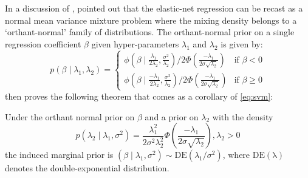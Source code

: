 \documentclass[lineno]{biometrika}
\begin{document}
In a discussion of \citet{polson2011data}, \citet{hans2011comment} pointed out that the elastic-net regression can be recast as a normal mean variance mixture problem where the mixing density belongs to a `orthant-normal' family of distributions. The orthant-normal prior on a single regression coefficient $\beta$ given hyper-parameters $\lambda_1$ and $\lambda_2$ is given by: 
\[
p (\beta \mid \lambda_1, \lambda_2)  = 
  \begin{cases} 
   \phi(\beta \mid \frac{\lambda_1}{2\lambda_2}, \frac{\sigma^2}{\lambda_2}) / 2\Phi(\frac{-\lambda_1}{2\sigma\sqrt{\lambda_2}}) & \text{if } \beta < 0 \\
   \phi(\beta \mid \frac{-\lambda_1}{2\lambda_2}, \frac{\sigma^2}{\lambda_2}) / 2\Phi(\frac{-\lambda_1}{2\sigma\sqrt{\lambda_2}})       & \text{if } \beta \geq 0
  \end{cases} \label{eq:hans}
\]
\citet{hans2011comment} then proves the following theorem that comes as a corollary of \eqref{eq:svm}: 
\begin{theorem}
Under the orthant normal prior on $\beta$ and a prior on $\lambda_2$ with the density
\begin{equation*}
p(\lambda_2 \mid \lambda_1, \sigma^2) = \frac{\lambda_1^2}{2\sigma^2\lambda_2^2} \Phi \left( \frac{-\lambda_1}{2\sigma \sqrt{\lambda_2}} \right), \lambda_2 > 0 
\end{equation*}
the induced marginal prior is $(\beta \mid \lambda_1, \sigma^2) \sim \mathrm{DE}(\lambda_1/\sigma^2)$, where $\mathrm{DE(\lambda)}$ denotes the double-exponential distribution. 
\end{theorem}
\end{document}
